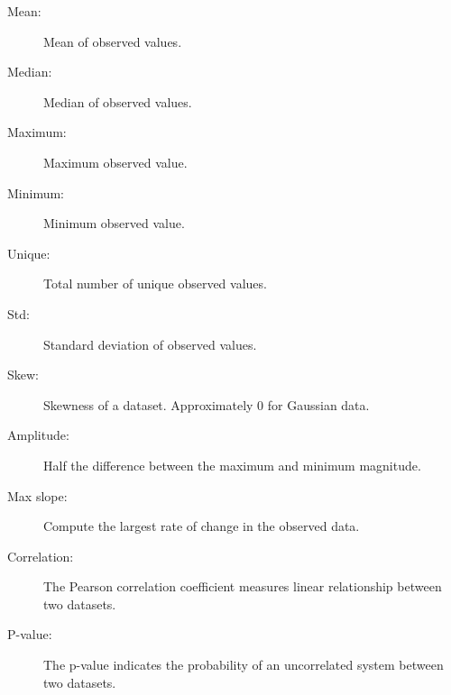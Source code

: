 \documentclass[a4]{article}
\begin{document}
\begin{description}
\item [Mean:] Mean of observed values.
\item [Median:] Median of observed values.
\item [Maximum:] Maximum observed value.
\item [Minimum:] Minimum observed value.
\item [Unique:] Total number of unique observed values. \cite{scipy2}
\item [Std:] Standard deviation of observed values.
\item [Skew:] Skewness of a dataset. Approximately 0 for Gaussian data.
\item [Amplitude:] Half the difference between the maximum and minimum magnitude.
\item [Max slope:] Compute the largest rate of change in the observed data.
\item [Correlation:] The Pearson correlation coefficient measures linear relationship between two datasets. \cite{scipy}
\item [P-value:] The p-value indicates the probability of an uncorrelated system between two datasets. \cite{scipy}
\end{description}

\newpage
\end{document}
